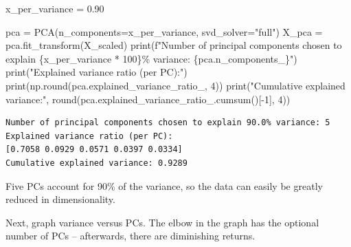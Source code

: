 \documentclass[
  letterpaper,
  DIV=11,
  numbers=noendperiod]{scrreprt}
\newenvironment{Shaded}{\begin{snugshade}}{\end{snugshade}}
\newcommand{\BuiltInTok}[1]{\textcolor[rgb]{0.00,0.23,0.31}{#1}}
\newcommand{\DecValTok}[1]{\textcolor[rgb]{0.68,0.00,0.00}{#1}}
\newcommand{\FloatTok}[1]{\textcolor[rgb]{0.68,0.00,0.00}{#1}}
\newcommand{\NormalTok}[1]{\textcolor[rgb]{0.00,0.23,0.31}{#1}}
\newcommand{\OperatorTok}[1]{\textcolor[rgb]{0.37,0.37,0.37}{#1}}
\newcommand{\SpecialCharTok}[1]{\textcolor[rgb]{0.37,0.37,0.37}{#1}}
\newcommand{\SpecialStringTok}[1]{\textcolor[rgb]{0.13,0.47,0.30}{#1}}
\newcommand{\StringTok}[1]{\textcolor[rgb]{0.13,0.47,0.30}{#1}}
\begin{document}
\begin{Shaded}
\begin{Highlighting}[]
\NormalTok{x\_per\_variance }\OperatorTok{=} \FloatTok{0.90}

\NormalTok{pca }\OperatorTok{=}\NormalTok{ PCA(n\_components}\OperatorTok{=}\NormalTok{x\_per\_variance, svd\_solver}\OperatorTok{=}\StringTok{"full"}\NormalTok{)}
\NormalTok{X\_pca }\OperatorTok{=}\NormalTok{ pca.fit\_transform(X\_scaled)}
\BuiltInTok{print}\NormalTok{(}\SpecialStringTok{f"Number of principal components chosen to explain }\SpecialCharTok{\{}\NormalTok{x\_per\_variance }\OperatorTok{*} \DecValTok{100}\SpecialCharTok{\}}\SpecialStringTok{\% variance: }\SpecialCharTok{\{}\NormalTok{pca}\SpecialCharTok{.}\NormalTok{n\_components\_}\SpecialCharTok{\}}\SpecialStringTok{"}\NormalTok{)}
\BuiltInTok{print}\NormalTok{(}\StringTok{"Explained variance ratio (per PC):"}\NormalTok{)}
\BuiltInTok{print}\NormalTok{(np.}\BuiltInTok{round}\NormalTok{(pca.explained\_variance\_ratio\_, }\DecValTok{4}\NormalTok{))}
\BuiltInTok{print}\NormalTok{(}\StringTok{"Cumulative explained variance:"}\NormalTok{, }\BuiltInTok{round}\NormalTok{(pca.explained\_variance\_ratio\_.cumsum()[}\OperatorTok{{-}}\DecValTok{1}\NormalTok{], }\DecValTok{4}\NormalTok{))}
\end{Highlighting}
\end{Shaded}

\begin{verbatim}
Number of principal components chosen to explain 90.0% variance: 5
Explained variance ratio (per PC):
[0.7058 0.0929 0.0571 0.0397 0.0334]
Cumulative explained variance: 0.9289
\end{verbatim}

Five PCs account for 90\% of the variance, so the data can easily be
greatly reduced in dimensionality.

Next, graph variance versus PCs. The elbow in the graph has the optional
number of PCs -- afterwards, there are diminishing returns.
\end{document}
